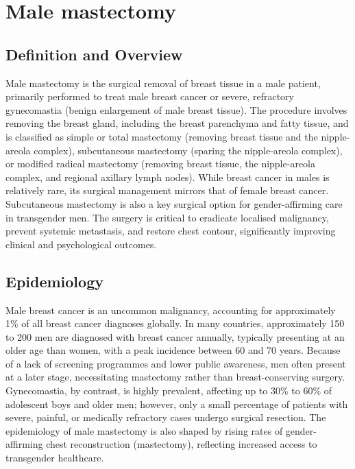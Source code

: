 \chapter{Male mastectomy}

\section*{Definition and Overview}
Male mastectomy is the surgical removal of breast tissue in a male patient, primarily performed to treat male breast cancer or severe, refractory gynecomastia (benign enlargement of male breast tissue). The procedure involves removing the breast gland, including the breast parenchyma and fatty tissue, and is classified as simple or total mastectomy (removing breast tissue and the nipple-areola complex), subcutaneous mastectomy (sparing the nipple-areola complex), or modified radical mastectomy (removing breast tissue, the nipple-areola complex, and regional axillary lymph nodes). While breast cancer in males is relatively rare, its surgical management mirrors that of female breast cancer. Subcutaneous mastectomy is also a key surgical option for gender-affirming care in transgender men. The surgery is critical to eradicate localised malignancy, prevent systemic metastasis, and restore chest contour, significantly improving clinical and psychological outcomes.

\section*{Epidemiology}
Male breast cancer is an uncommon malignancy, accounting for approximately 1\% of all breast cancer diagnoses globally. In many countries, approximately 150 to 200 men are diagnosed with breast cancer annually, typically presenting at an older age than women, with a peak incidence between 60 and 70 years. Because of a lack of screening programmes and lower public awareness, men often present at a later stage, necessitating mastectomy rather than breast-conserving surgery. Gynecomastia, by contrast, is highly prevalent, affecting up to 30\% to 60\% of adolescent boys and older men; however, only a small percentage of patients with severe, painful, or medically refractory cases undergo surgical resection. The epidemiology of male mastectomy is also shaped by rising rates of gender-affirming chest reconstruction (mastectomy), reflecting increased access to transgender healthcare.

